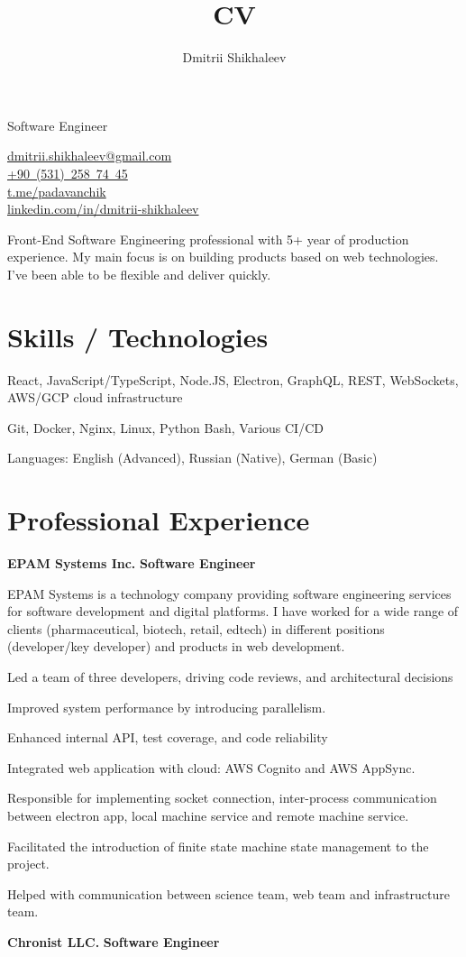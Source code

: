 \documentclass[11pt, a4paper]{article}
\title{CV}
\author{Dmitrii Shikhaleev}
\makeatletter
\newcommand{\cvdate}[1]{
  {\small\narrower\normalfont\color{ColorGrey2}{#1}}
}
\newcommand{\cvposition}[1]{\normalsize\textbf{#1}}
\newcommand{\cvcompany}[1]{\Large\textbf{#1}}
\newcommand{\cventry}[3]{
  \cvcompany{#1} \hfill \break
  \cvposition{#2} \hfill \cvdate{#3}\break 
  \vspace{-1em}
}
\renewcommand{\maketitle}{
  \noindent

  \begin{minipage}[t]{0.5\textwidth}
  \vspace{-\baselineskip} %
      {\Large\color{ColorGrey}\textbf{\theauthor}} \hfill\break
      Software Engineer \hfill\break
  \end{minipage}
  \hfill%
  \begin{minipage}[t]{0.5\textwidth}
  \begin{flushright}
  \vspace{-\baselineskip} %
    \href{mailto:dmitrii.shikhaleev@gmail.com}{dmitrii.shikhaleev@gmail.com} \\
    \href{tel:+905312587445}{+90~(531)~258~74~45} \\
    \href{http://t.me/padavanchik}{t.me/padavanchik} \\ 
    \href{https://www.linkedin.com/in/dmitrii-shikhaleev/}{linkedin.com/in/dmitrii-shikhaleev} \\
  \end{flushright}
  \end{minipage}

  \vspace{0.8em}
}
\newcommand{\cvlistitem}[1]{
  \begin{minipage}[t]{\textwidth}
  \strut\hspace{0.5em}\textcolor{ColorBlue}{\large\rmfamily\textbullet}\hspace{0.5em}#1
  \vspace{2pt}
  \end{minipage}
}
\makeatother
\begin{document}
\maketitle
{}

Front-End Software Engineering professional with 5+ year of production experience. My main focus is on building products based on web technologies. I've been able to be flexible and deliver quickly. 

\section{Skills / Technologies}

\cvlistitem{React, JavaScript/TypeScript, Node.JS, Electron, GraphQL, REST, WebSockets, AWS/GCP cloud infrastructure}%
\cvlistitem{Git, Docker, Nginx, Linux, Python Bash, Various CI/CD}%
\cvlistitem{Languages: English (Advanced), Russian (Native), German (Basic)}%

\section{Professional Experience}

\cventry
{EPAM Systems Inc.}
{Software Engineer}
{Jan 2019 -- Present}

EPAM Systems is a technology company providing software engineering services for software development and digital platforms. I have worked for a wide range of clients (pharmaceutical, biotech, retail, edtech) in different positions (developer/key developer) and products in web development.
\break

\cvlistitem{Led a team of three developers, driving code reviews, and architectural decisions}
\cvlistitem{Improved system performance by introducing parallelism.}
\cvlistitem{Enhanced internal API, test coverage, and code reliability}
\cvlistitem{Integrated web application with cloud: AWS Cognito and AWS AppSync.}
\cvlistitem{Responsible for implementing socket connection, inter-process communication between electron app, local machine service and remote machine service.}
\cvlistitem{Facilitated the introduction of finite state machine state management to the project.}
\cvlistitem{Helped with communication between science team, web team and infrastructure team.}

\cventry
{Chronist LLC.}
{Software Engineer}
{Jan, 2017 -- Jan, 2019}
\end{document}
